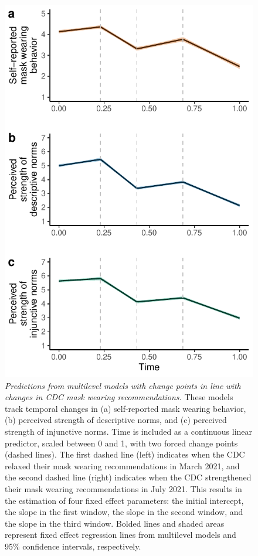 \documentclass[
  man,floatsintext]{apa6}
\begin{document}
\begin{figure}
\centering
\includegraphics{manuscript_files/figure-latex/plotCDCSens-1.pdf}
\caption{\label{fig:plotCDCSens}\emph{Predictions from multilevel models with change points in line with changes in CDC mask wearing recommendations.} These models track temporal changes in (a) self-reported mask wearing behavior, (b) perceived strength of descriptive norms, and (c) perceived strength of injunctive norms. Time is included as a continuous linear predictor, scaled between 0 and 1, with two forced change points (dashed lines). The first dashed line (left) indicates when the CDC relaxed their mask wearing recommendations in March 2021, and the second dashed line (right) indicates when the CDC strengthened their mask wearing recommendations in July 2021. This results in the estimation of four fixed effect parameters: the initial intercept, the slope in the first window, the slope in the second window, and the slope in the third window. Bolded lines and shaded areas represent fixed effect regression lines from multilevel models and 95\% confidence intervals, respectively.}
\end{figure}
\end{document}
